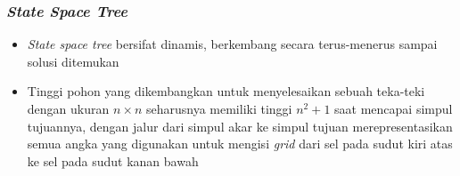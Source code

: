 \documentclass{beamer}
\begin{document}
\begin{frame}
\frametitle{\protect\textit{State Space Tree}}
\begin{itemize}
\item \textit{State space tree} bersifat dinamis, berkembang secara terus-menerus sampai solusi ditemukan
\item Tinggi pohon yang dikembangkan untuk menyelesaikan sebuah teka-teki dengan ukuran \begin{math}n \times n\end{math} seharusnya memiliki tinggi \begin{math}n^2+1\end{math} saat mencapai simpul tujuannya, dengan jalur dari simpul akar ke simpul tujuan merepresentasikan semua angka yang digunakan untuk mengisi \textit{grid} dari sel pada sudut kiri atas ke sel pada sudut kanan bawah
\end{itemize}
\end{frame}

\end{document}
